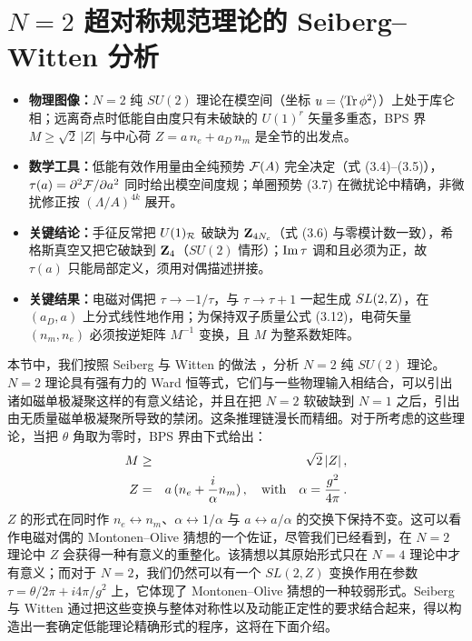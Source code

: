 \section{$N=2$ 超对称规范理论的 Seiberg--Witten 分析}

\begin{keypoints}
\begin{itemize}[leftmargin=1.4em,itemsep=2pt,topsep=2pt,parsep=0pt]
  \item \textbf{物理图像：}$N=2$ 纯 $SU(2)$ 理论在模空间（坐标 $u=\langle{\rm Tr}\,\phi^2\rangle$）上处于库仑相；远离奇点时低能自由度只有未破缺的 $U(1)^{r}$ 矢量多重态，BPS 界 $M\geq\sqrt{2}\,|Z|$ 与中心荷 $Z=a\,n_e+a_D\,n_m$ 是全节的出发点。
  \item \textbf{数学工具：}低能有效作用量由全纯预势 ${\cal F}(A)$ 完全决定（式 (3.4)--(3.5)），$\tau(a)=\partial^2{\cal F}/\partial a^2$ 同时给出模空间度规；单圈预势 (3.7) 在微扰论中精确，非微扰修正按 $(\Lambda/A)^{4k}$ 展开。
  \item \textbf{关键结论：}手征反常把 $U(1)_{\cal R}$ 破缺为 ${\bf Z}_{4N_c}$（式 (3.6) 与零模计数一致），希格斯真空又把它破缺到 ${\bf Z}_4$（$SU(2)$ 情形）；${\rm Im}\,\tau$ 调和且必须为正，故 $\tau(a)$ 只能局部定义，须用对偶描述拼接。
  \item \textbf{关键结果：}电磁对偶把 $\tau\to-1/\tau$，与 $\tau\to\tau+1$ 一起生成 $SL(2,{\rm Z})$，在 $(a_D,a)$ 上分式线性地作用；为保持双子质量公式 (3.12)，电荷矢量 $(n_m,n_e)$ 必须按逆矩阵 $M^{-1}$ 变换，且 $M$ 为整系数矩阵。
\end{itemize}
\end{keypoints}

本节中，我们按照 Seiberg 与 Witten 的做法 \cite{SW-I}，分析 $N=2$ 纯 $SU(2)$ 理论。$N=2$ 理论具有强有力的 Ward 恒等式，它们与一些物理输入相结合，可以引出诸如磁单极凝聚这样的有意义结论，并且在把 $N=2$ 软破缺到 $N=1$ 之后，引出由无质量磁单极凝聚所导致的禁闭。这条推理链漫长而精细。对于所考虑的这些理论，当把 $\theta$ 角取为零时，BPS 界由下式给出：
\begin{eqnarray}
M &\geq& \sqrt{2}\,\vert Z \vert\,,\nonumber \\
Z &=& a\,(n_e + {i\over \alpha} n_m)\,,\quad{\rm with}\quad 
\alpha = {g^2\over 4\pi}\,. \nonumber
\end{eqnarray}
$Z$ 的形式在同时作 $n_e \leftrightarrow n_m$、$\alpha\leftrightarrow 1/\alpha$ 与 $a \leftrightarrow a/\alpha$ 的交换下保持不变。这可以看作电磁对偶的 Montonen--Olive 猜想的一个佐证，尽管我们已经看到，在 $N=2$ 理论中 $Z$ 会获得一种有意义的重整化。该猜想以其原始形式只在 $N=4$ 理论中才有意义；而对于 $N=2$，我们仍然可以有一个 $SL(2, Z)$ 变换作用在参数 $\tau = \theta/2\pi + i4\pi/g^2$ 上，它体现了 Montonen--Olive 猜想的一种较弱形式。Seiberg 与 Witten 通过把这些变换与整体对称性以及动能正定性的要求结合起来，得以构造出一套确定低能理论精确形式的程序，这将在下面介绍。

